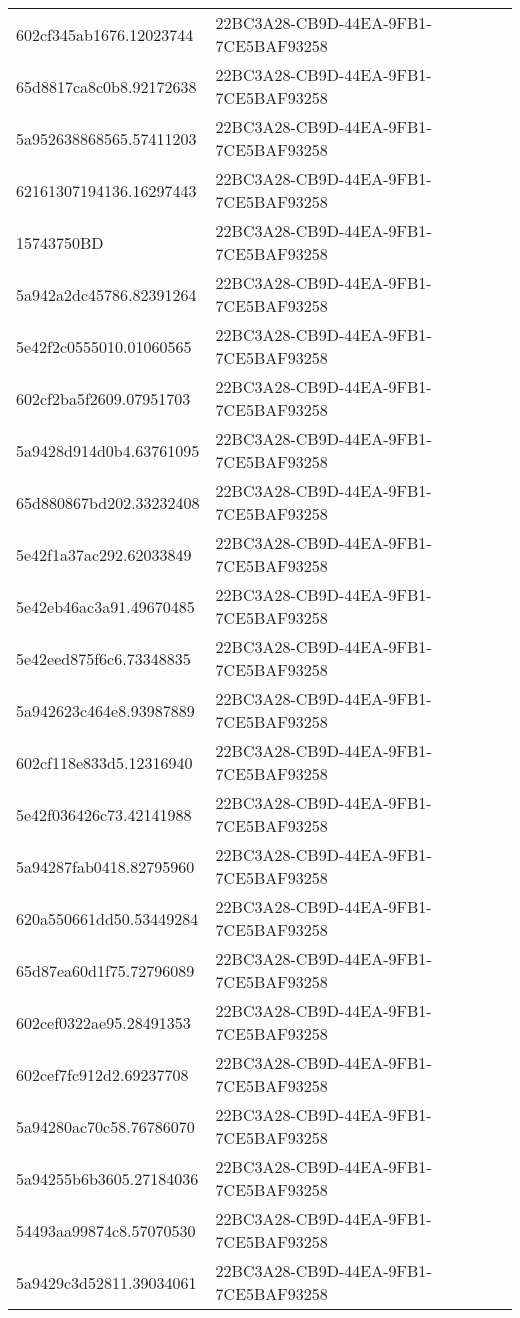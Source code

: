 \begin{tabular}{ll}
602cf345ab1676.12023744 & 22BC3A28-CB9D-44EA-9FB1-7CE5BAF93258 \\
65d8817ca8c0b8.92172638 & 22BC3A28-CB9D-44EA-9FB1-7CE5BAF93258 \\
5a952638868565.57411203 & 22BC3A28-CB9D-44EA-9FB1-7CE5BAF93258 \\
62161307194136.16297443 & 22BC3A28-CB9D-44EA-9FB1-7CE5BAF93258 \\
15743750BD & 22BC3A28-CB9D-44EA-9FB1-7CE5BAF93258 \\
5a942a2dc45786.82391264 & 22BC3A28-CB9D-44EA-9FB1-7CE5BAF93258 \\
5e42f2c0555010.01060565 & 22BC3A28-CB9D-44EA-9FB1-7CE5BAF93258 \\
602cf2ba5f2609.07951703 & 22BC3A28-CB9D-44EA-9FB1-7CE5BAF93258 \\
5a9428d914d0b4.63761095 & 22BC3A28-CB9D-44EA-9FB1-7CE5BAF93258 \\
65d880867bd202.33232408 & 22BC3A28-CB9D-44EA-9FB1-7CE5BAF93258 \\
5e42f1a37ac292.62033849 & 22BC3A28-CB9D-44EA-9FB1-7CE5BAF93258 \\
5e42eb46ac3a91.49670485 & 22BC3A28-CB9D-44EA-9FB1-7CE5BAF93258 \\
5e42eed875f6c6.73348835 & 22BC3A28-CB9D-44EA-9FB1-7CE5BAF93258 \\
5a942623c464e8.93987889 & 22BC3A28-CB9D-44EA-9FB1-7CE5BAF93258 \\
602cf118e833d5.12316940 & 22BC3A28-CB9D-44EA-9FB1-7CE5BAF93258 \\
5e42f036426c73.42141988 & 22BC3A28-CB9D-44EA-9FB1-7CE5BAF93258 \\
5a94287fab0418.82795960 & 22BC3A28-CB9D-44EA-9FB1-7CE5BAF93258 \\
620a550661dd50.53449284 & 22BC3A28-CB9D-44EA-9FB1-7CE5BAF93258 \\
65d87ea60d1f75.72796089 & 22BC3A28-CB9D-44EA-9FB1-7CE5BAF93258 \\
602cef0322ae95.28491353 & 22BC3A28-CB9D-44EA-9FB1-7CE5BAF93258 \\
602cef7fc912d2.69237708 & 22BC3A28-CB9D-44EA-9FB1-7CE5BAF93258 \\
5a94280ac70c58.76786070 & 22BC3A28-CB9D-44EA-9FB1-7CE5BAF93258 \\
5a94255b6b3605.27184036 & 22BC3A28-CB9D-44EA-9FB1-7CE5BAF93258 \\
54493aa99874c8.57070530 & 22BC3A28-CB9D-44EA-9FB1-7CE5BAF93258 \\
5a9429c3d52811.39034061 & 22BC3A28-CB9D-44EA-9FB1-7CE5BAF93258 \\

\end{tabular}
